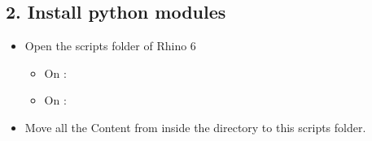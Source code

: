 \documentclass[letterpaper,10pt,english]{sphinxmanual}
\begin{document}
\subsection{2. Install python modules}
\label{\detokenize{README:install-python-modules}}\label{\detokenize{README:id3}}\begin{itemize}
\item {} 
Open the scripts folder of Rhino 6
\begin{itemize}
\item {} 
On :


\item {} 
On :


\end{itemize}

\item {} 
Move all the Content from inside the  directory to this
scripts folder.

\end{itemize}
\end{document}
